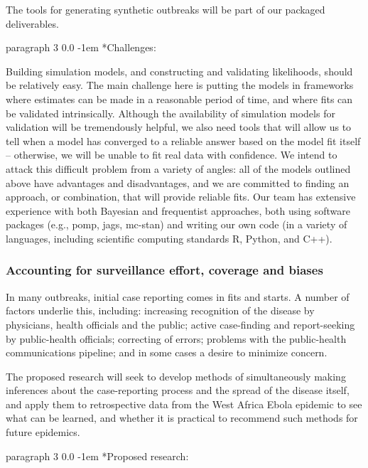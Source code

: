 \documentclass[12pt]{article}
\makeatletter
\renewcommand{\paragraph}{\vspace{0.40ex \@plus 0.2ex \@minus 0.0ex}\@startsection%
{paragraph}%
{3}%
{\parindent}%
{0.0\baselineskip}%
{-1em}%
{\normalfont\normalsize\bfseries}}%
\makeatother
\begin{document}
The tools for generating synthetic outbreaks will be part of our packaged deliverables.

\paragraph*{Challenges:}

Building simulation models, and constructing and validating likelihoods, should be relatively easy. The main challenge here is putting the models in frameworks where estimates can be made in a reasonable period of time, and where fits can be validated intrinsically. Although the availability of simulation models for validation will be tremendously helpful, we also need tools that will allow us to tell when a model has converged to a reliable answer based on the model fit itself -- otherwise, we will be unable to fit real data with confidence. We intend to attack this difficult problem from a variety of angles: all of the models outlined above have advantages and disadvantages, and we are committed to finding an approach, or combination, that will provide reliable fits. Our team has extensive experience with both Bayesian and frequentist approaches, both using software packages (e.g., pomp, jags, mc-stan) and writing our own code (in a variety of languages, including scientific computing standards R, Python, and C++).

\subsubsection{Accounting for surveillance effort, coverage and biases}

In many outbreaks, initial case reporting comes in fits and starts. A number of factors underlie this, including: increasing recognition of the disease by physicians, health officials and the public; active case-finding and report-seeking by public-health officials; correcting of errors; problems with the public-health communications pipeline; and in some cases a desire to minimize concern.

The proposed research will seek to develop methods of simultaneously making inferences about the case-reporting process and the spread of the disease itself, and apply them to retrospective data from the West Africa Ebola epidemic to see what can be learned, and whether it is practical to recommend such methods for future epidemics.

\paragraph*{Proposed research:}
\end{document}
